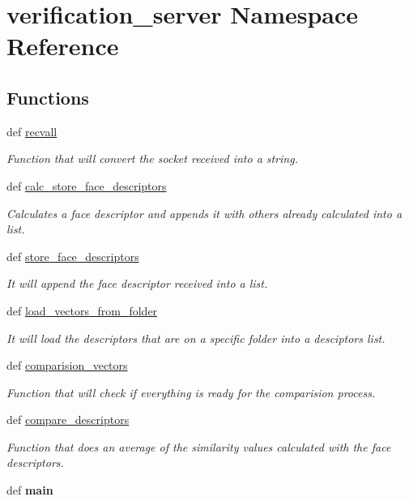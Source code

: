 \hypertarget{namespaceverification__server}{\section{verification\-\_\-server Namespace Reference}
\label{namespaceverification__server}
}
\subsection*{Functions}
\begin{DoxyCompactItemize}
\item 
def \hyperlink{namespaceverification__server_aa0dccdc3f03c989218ef40e03d79e60f}{recvall}
\begin{DoxyCompactList}\small\item\em Function that will convert the socket received into a string. \end{DoxyCompactList}\item 
def \hyperlink{namespaceverification__server_a5b96ff950d3272c3a55454ff66655764}{calc\-\_\-store\-\_\-face\-\_\-descriptors}
\begin{DoxyCompactList}\small\item\em Calculates a face descriptor and appends it with others already calculated into a list. \end{DoxyCompactList}\item 
def \hyperlink{namespaceverification__server_af845c1ab5a3c1014b13066b988f6aee3}{store\-\_\-face\-\_\-descriptors}
\begin{DoxyCompactList}\small\item\em It will append the face descriptor received into a list. \end{DoxyCompactList}\item 
def \hyperlink{namespaceverification__server_a44157a0a320f3a705bcfce8157db3d45}{load\-\_\-vectors\-\_\-from\-\_\-folder}
\begin{DoxyCompactList}\small\item\em It will load the descriptors that are on a specific folder into a desciptors list. \end{DoxyCompactList}\item 
def \hyperlink{namespaceverification__server_a03ca32aaae518a847244d85a923a932b}{comparision\-\_\-vectors}
\begin{DoxyCompactList}\small\item\em Function that will check if everything is ready for the comparision process. \end{DoxyCompactList}\item 
def \hyperlink{namespaceverification__server_a0a5e06d754b96bbd99a8abb3ac8aebf5}{compare\-\_\-descriptors}
\begin{DoxyCompactList}\small\item\em Function that does an average of the similarity values calculated with the face descriptors. \end{DoxyCompactList}\item 
\hypertarget{namespaceverification__server_a2627b9152fdabc83485cb774e1bf7494}{def {\bfseries main}}\label{namespaceverification__server_a2627b9152fdabc83485cb774e1bf7494}


\end{DoxyCompactItemize}
